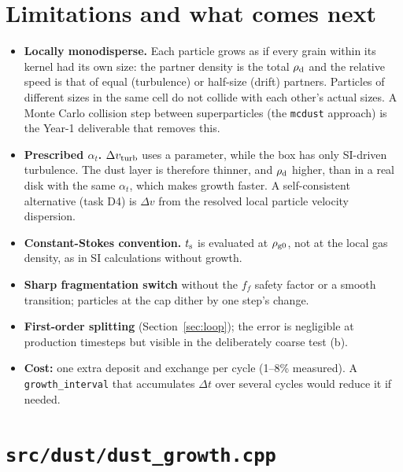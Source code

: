 \documentclass[11pt]{article}
\newcommand{\code}[1]{\texttt{#1}}
\newcommand{\file}[1]{\texttt{\small #1}}
\newcommand{\ts}{t_{\rm s}}
\newcommand{\rhod}{\rho_{\rm d}}
\begin{document}
\section{Limitations and what comes next}\label{sec:limits}
\begin{itemize}
\item \textbf{Locally monodisperse.} Each particle grows as if every grain within its
  kernel had its own size: the partner density is the total $\rhod$ and the relative
  speed is that of equal (turbulence) or half-size (drift) partners. Particles of
  different sizes in the same cell do not collide with each other's actual sizes. A
  Monte Carlo collision step between superparticles (the \code{mcdust} approach) is the
  Year-1 deliverable that removes this.
\item \textbf{Prescribed $\alpha_t$.} $\Delta v_{\rm turb}$ uses a parameter, while the
  box has only SI-driven turbulence. The dust layer is therefore thinner, and $\rhod$
  higher, than in a real disk with the same $\alpha_t$, which makes growth faster. A
  self-consistent alternative (task D4) is $\Delta v$ from the resolved local particle
  velocity dispersion.
\item \textbf{Constant-Stokes convention.} $\ts$ is evaluated at $\rho_{\rm g0}$, not at the
  local gas density, as in SI calculations without growth.
\item \textbf{Sharp fragmentation switch} without the $f_f$ safety factor or a smooth
  transition; particles at the cap dither by one step's change.
\item \textbf{First-order splitting} (Section~\ref{sec:loop}); the error is negligible
  at production timesteps but visible in the deliberately coarse test (b).
\item \textbf{Cost:} one extra deposit and exchange per cycle (1--8\% measured). A
  \code{growth\_interval} that accumulates $\Delta t$ over several cycles would reduce it
  if needed.
\end{itemize}

\appendix
\section{\file{src/dust/dust\_growth.cpp}}\label{app:source}

\end{document}
